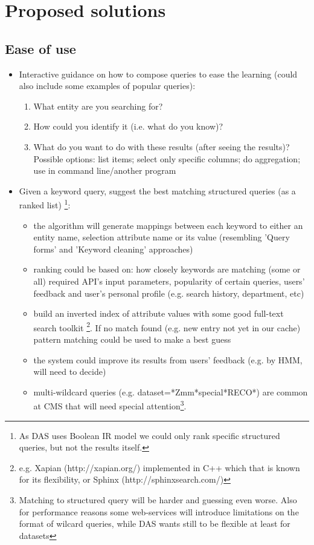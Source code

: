 \section{Proposed solutions}
\subsection{Ease of use}

\begin{itemize}
\item Interactive guidance on how to compose queries to ease the learning (could also include some examples of popular queries):
\begin{enumerate}
\item What entity are you searching for?
\item How could you identify it (i.e. what do you know)?
\item What do you want to do with these results (after seeing the results)? Possible options: list items; select only specific columns; do aggregation; use in command line/another program
\end{enumerate}


\item Given a keyword query, suggest the best matching structured queries (as a ranked list)%
 	\footnote{As DAS uses Boolean IR model we could only rank specific structured queries, but not the results itself.}:
	\begin{itemize}
	\item the algorithm will generate mappings between each keyword to either an entity name, selection attribute name or its value (resembling 'Query forms' and 'Keyword cleaning' approaches)
	\item ranking could be based on: how closely keywords are matching (some or all) required API's input parameters, popularity of certain queries, users' feedback	 and user's personal profile (e.g. search history, department, etc)
	\item build an inverted index of attribute values with some good full-text search toolkit%
				\footnote{e.g. Xapian (http://xapian.org/) implemented in C++ which that is known for its flexibility, or Sphinx (http://sphinxsearch.com/)}. 
	If no match found (e.g. new entry not yet in our cache) pattern matching could be used to make a best guess
	\item the system could improve its results from users' feedback (e.g. by HMM, will need to decide)
	\item multi-wildcard queries (e.g. dataset=*Zmm*special*RECO*) are common at CMS that will need special attention\footnote{Matching to structured query will be harder and guessing even worse. Also for performance reasons some web-services will introduce limitations on the format of wilcard queries, while DAS wants still to be flexible at least for datasets}.
	

\end{itemize}
\end{itemize}
